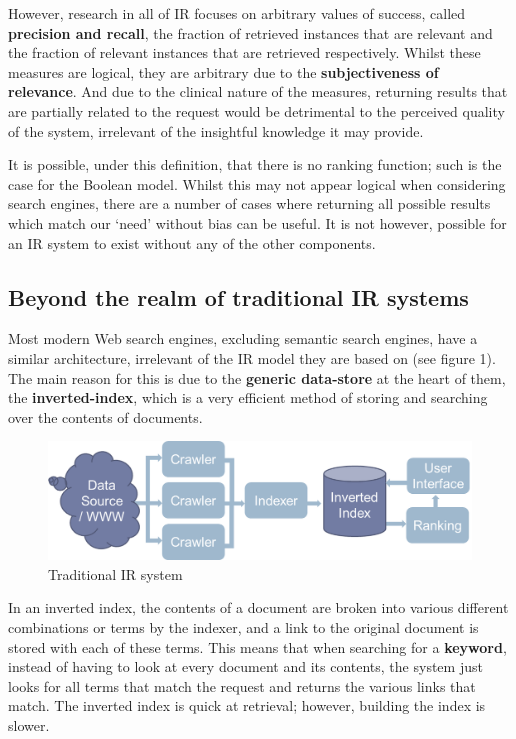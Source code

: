 However, research in all of IR focuses on arbitrary values of success, called \textbf{precision and recall}, the fraction of retrieved instances that are relevant and the fraction of relevant instances that are retrieved respectively. Whilst these measures are logical, they are arbitrary due to the \textbf{subjectiveness of relevance}. And due to the clinical nature of the measures, returning results that are partially related to the request would be detrimental to the perceived quality of the system, irrelevant of the insightful knowledge it may provide.

It is possible, under this definition, that there is no ranking function; such is the case for the Boolean model. Whilst this may not appear logical when considering search engines, there are a number of cases where returning all possible results which match our `need' without bias can be useful. It is not however, possible for an IR system to exist without any of the other components.

\subsection{Beyond the realm of traditional IR systems}

Most modern Web search engines, excluding semantic search engines, have a similar architecture, irrelevant of the IR model they are based on (see figure 1). The main reason for this is due to the \textbf{generic data-store} at the heart of them, the \textbf{inverted-index}, which is a very efficient method of storing and searching over the contents of documents.

\begin{figure}[!htb] %
\centering
\includegraphics[width=\textwidth]{images/architecture.png}
\caption[Traditional IR system]{Traditional IR system}
\label{fig:architecture}
\end{figure}

In an inverted index, the contents of a document are broken into various different combinations or terms by the indexer, and a link to the original document is stored with each of these terms. This means that when searching for a \textbf{keyword}, instead of having to look at every document and its contents, the system just looks for all terms that match the request and returns the various links that match. The inverted index is quick at retrieval; however, building the index is slower.

